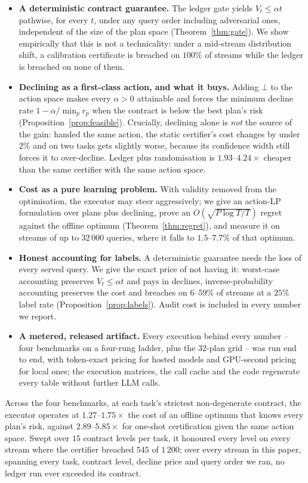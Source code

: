 \begin{itemize}
\item \textbf{A deterministic contract guarantee.} The ledger gate
      yields $V_t \le \alpha t$ pathwise, for every $t$, under any query
      order including adversarial ones, independent of the size of the
      plan space (Theorem~\ref{thm:gate}). We show empirically that this
      is not a technicality: under a mid-stream distribution shift, a
      calibration certificate is breached on $100\%$ of streams while
      the ledger is breached on none of them.
\item \textbf{Declining as a first-class action, and what it buys.}
      Adding $\bot$ to the action space makes every $\alpha > 0$
      attainable and forces the minimum decline rate
      $1 - \alpha/\min_p r_p$ when the contract is below the best plan's
      risk (Proposition~\ref{prop:feasible}). Crucially, declining alone
      is \emph{not} the source of the gain: handed the same action, the
      static certifier's cost changes by under $2\%$ and on two tasks
      gets slightly worse, because its confidence width still forces it
      to over-decline. Ledger plus randomisation is
      $1.93$--$4.24\times$ cheaper than the same certifier with the same
      action space.
\item \textbf{Cost as a pure learning problem.} With validity removed
      from the optimisation, the executor may steer aggressively; we
      give an action-LP formulation over plans plus declining, prove an
      $O(\sqrt{P\log T / T})$ regret against the offline optimum
      (Theorem~\ref{thm:regret}), and measure it on streams of up to
      $32\,000$ queries, where it falls to $1.5$--$7.7\%$ of that
      optimum.
\item \textbf{Honest accounting for labels.} A deterministic guarantee
      needs the loss of every served query. We give the exact price of
      not having it: worst-case accounting preserves
      $V_t \le \alpha t$ and pays in declines, inverse-probability
      accounting preserves the cost and breaches on $6$--$59\%$ of
      streams at a $25\%$ label rate
      (Proposition~\ref{prop:labels}). Audit cost is included in every
      number we report.
\item \textbf{A metered, released artifact.} Every execution behind
      every number -- four benchmarks on a four-rung ladder, plus the
      $32$-plan grid -- was run end to end, with token-exact pricing for
      hosted models and GPU-second pricing for local ones; the execution
      matrices, the call cache and the code regenerate every table
      without further LLM calls.
\end{itemize}

Across the four benchmarks, at each task's strictest non-degenerate
contract, the executor operates at $1.27$--$1.75\times$ the cost of an
offline optimum that knows every plan's risk, against
$2.89$--$5.85\times$ for one-shot certification given the same action
space. Swept over $15$ contract levels per task, it honoured every level
on every stream where the certifier breached $545$ of $1\,200$; over
every stream in this paper, spanning every task, contract level, decline
price and query order we ran, no ledger run ever exceeded its contract.
